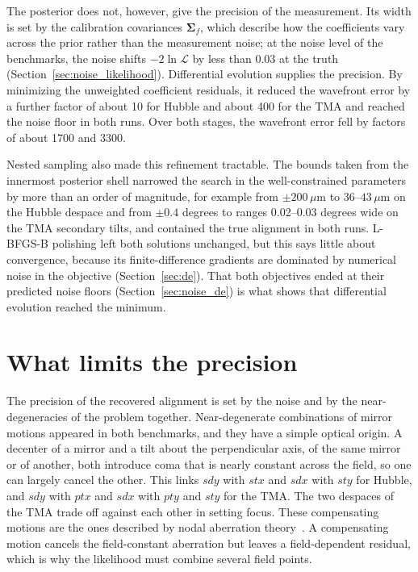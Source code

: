 The posterior does not, however, give the precision of the measurement. Its width is set by the calibration covariances $\boldsymbol{\Sigma}_f$, which describe how the coefficients vary across the prior rather than the measurement noise; at the noise level of the benchmarks, the noise shifts $-2\ln\mathcal{L}$ by less than 0.03 at the truth (Section~\ref{sec:noise_likelihood}). Differential evolution supplies the precision. By minimizing the unweighted coefficient residuals, it reduced the wavefront error by a further factor of about 10 for Hubble and about 400 for the TMA and reached the noise floor in both runs. Over both stages, the wavefront error fell by factors of about 1700 and 3300.

Nested sampling also made this refinement tractable. The bounds taken from the innermost posterior shell narrowed the search in the well-constrained parameters by more than an order of magnitude, for example from $\pm200\,\mu\mathrm{m}$ to 36--$43\,\mu\mathrm{m}$ on the Hubble despace and from $\pm0.4$ degrees to ranges 0.02--0.03 degrees wide on the TMA secondary tilts, and contained the true alignment in both runs. L-BFGS-B polishing left both solutions unchanged, but this says little about convergence, because its finite-difference gradients are dominated by numerical noise in the objective (Section~\ref{sec:de}). That both objectives ended at their predicted noise floors (Section~\ref{sec:noise_de}) is what shows that differential evolution reached the minimum.

\section{What limits the precision}\label{sec:conc_precision}

The precision of the recovered alignment is set by the noise and by the near-degeneracies of the problem together. Near-degenerate combinations of mirror motions appeared in both benchmarks, and they have a simple optical origin. A decenter of a mirror and a tilt about the perpendicular axis, of the same mirror or of another, both introduce coma that is nearly constant across the field, so one can largely cancel the other. This links $sdy$ with $stx$ and $sdx$ with $sty$ for Hubble, and $sdy$ with $ptx$ and $sdx$ with $pty$ and $sty$ for the TMA. The two despaces of the TMA trade off against each other in setting focus. These compensating motions are the ones described by nodal aberration theory~\citep{Thompson2005,SchechterLevinson2011}. A compensating motion cancels the field-constant aberration but leaves a field-dependent residual, which is why the likelihood must combine several field points.

